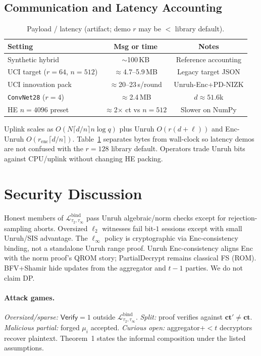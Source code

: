 \documentclass[conference]{IEEEtran}
\newcommand{\Verify}{\mathsf{Verify}}
\begin{document}
\subsection{Communication and Latency Accounting}
\begin{table}[t]
\caption{Payload / latency (artifact; demo $r$ may be $<$ library default).}
\label{tab:comm}
\centering
\scriptsize
\begin{tabular}{@{}lcc@{}}
\toprule
Setting & Msg or time & Notes \\
\midrule
Synthetic hybrid & $\sim$100\,KB & Reference accounting \\
UCI target ($r{=}64$, $n{=}512$) & $\approx$4.7--5.9\,MB & Legacy target JSON \\
UCI innovation pack & $\approx$20--23\,s/round & Unruh-Enc+$\!$PD-NIZK \\
\texttt{ConvNet28} ($r{=}4$) & $\approx$2.4\,MB & $d{\approx}51.6$k \\
HE $n{=}4096$ preset & $\approx$2$\times$ ct vs $n{=}512$ & Slower on NumPy \\
\bottomrule
\end{tabular}
\end{table}
Uplink scales as $O\!\left(N\lceil d/n\rceil n\log q\right)$ plus Unruh $O(r(d+\ell))$ and Enc-Unruh $O(r_{\mathrm{enc}}\lceil d/n\rceil)$. Table~\ref{tab:comm} separates bytes from wall-clock so latency demos are not confused with the $r{=}128$ library default. Operators trade Unruh bits against CPU/uplink without changing HE packing.

\section{Security Discussion}
Honest members of $\mathcal{L}_{\tau_2,\tau_\infty}^{\mathrm{bind}}$ pass Unruh algebraic/norm checks except for rejection-sampling aborts. Oversized $\ell_2$ witnesses fail bit-$1$ sessions except with small Unruh/SIS advantage. The $\ell_\infty$ policy is cryptographic via Enc-consistency binding, not a standalone Unruh range proof. Unruh Enc-consistency aligns Enc with the norm proof's QROM story; PartialDecrypt remains classical FS (ROM). BFV+Shamir hide updates from the aggregator and $t{-}1$ parties. We do not claim DP.

\paragraph{Attack games.}
\emph{Oversized/sparse:} $\Verify=1$ outside $\mathcal{L}_{\tau_2,\tau_\infty}^{\mathrm{bind}}$. \emph{Split:} proof verifies against $\mathbf{ct}'\neq\mathbf{ct}$. \emph{Malicious partial:} forged $\mu_i$ accepted. \emph{Curious open:} aggregator+$\!{<}t$ decryptors recover plaintext. Theorem~1 states the informal composition under the listed assumptions.
\end{document}
